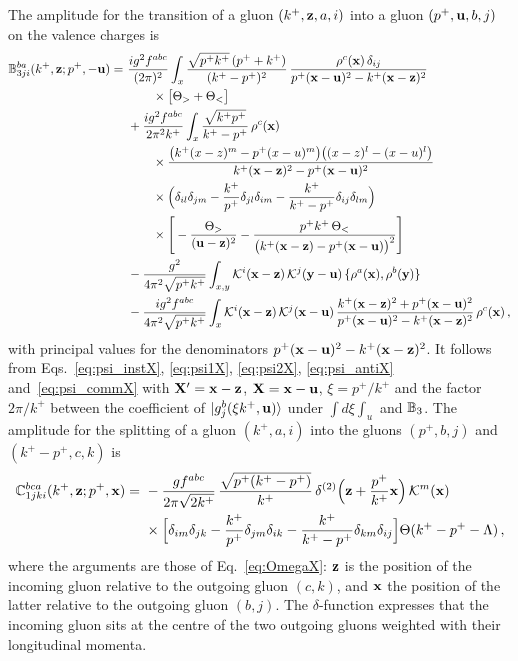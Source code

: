The amplitude for the transition of a gluon $(k^+,\mathbf{z},a,i)$ into a gluon $(p^+,\mathbf{u},b,j)$ on the valence charges is
\begin{align}\label{eq:B3X}
\mf B^{ba}_{3ji}(k^+,\v z;p^+,-\v u)=\ &\frac{ig^2f^{abc}}{(2\pi)^2}\int_x\frac{\sqrt{p^+k^+}\,(p^++k^+)}{(k^+-p^+)^2}\,\frac{\rho^c(\v x)\,\delta_{ij}}{p^+(\v x-\v u)^2-k^+(\v x-\v z)^2}
\notag\\&\qquad\times\big[\Theta_>+\Theta_<\big]
\notag\\&
+\frac{ig^2f^{abc}}{2\pi^2k^+}\int_x\frac{\sqrt{k^+p^+}}{k^+-p^+}\,\rho^c(\v x)
\notag\\&\qquad\times\frac{\big(k^+(x-z)^m-p^+(x-u)^m\big)\big((x-z)^l-(x-u)^l\big)}{k^+(\v x-\v z)^2-p^+(\v x-\v u)^2}
\notag\\&\qquad\times\Big(\delta_{il}\delta_{jm}-\frac{k^+}{p^+}\delta_{jl}\delta_{im}-\frac{k^+}{k^+-p^+}\delta_{ij}\delta_{lm}\Big)
\notag\\&\qquad\times\Bigg[-\frac{\Theta_>}{(\v u-\v z)^2}-\frac{p^+k^+\,\Theta_<}{\big(k^+(\v x-\v z)-p^+(\v x-\v u)\big)^2}\Bigg]
\notag\\&
-\frac{g^2}{4\pi^2\sqrt{p^+k^+}}\int_{x,y}\Kv^i(\v x-\v z)\,\Kv^j(\v y-\v u)\,\{\rho^a(\v x),\rho^b(\v y)\}
\notag\\&
-\frac{ig^2f^{abc}}{4\pi^2\sqrt{p^+k^+}}\int_x\Kv^i(\v x-\v z)\,\Kv^j(\v x-\v u)\,
\frac{k^+(\v x-\v z)^2+p^+(\v x-\v u)^2}{p^+(\v x-\v u)^2-k^+(\v x-\v z)^2}\,\rho^c(\v x)\,,
\end{align}
with principal values for the denominators $p^+(\mathbf{x}-\mathbf{u})^2-k^+(\mathbf{x}-\mathbf{z})^2$. It follows from Eqs.~\eqref{eq:psi_instX}, \eqref{eq:psi1X}, \eqref{eq:psi2X}, \eqref{eq:psi_antiX} and~\eqref{eq:psi_commX} with $\mathbf{X}'=\mathbf{x}-\mathbf{z}$, $\mathbf{X}=\mathbf{x}-\mathbf{u}$, $\xi=p^+/k^+$ and the factor $2\pi/k^+$ between the coefficient of $\ket{g^b_j(\xi k^+,\mathbf{u})}$ under $\int d\xi\int_u$ and $\mathbb{B}_3$. The amplitude for the splitting of a gluon $(k^+,a,i)$ into the gluons $(p^+,b,j)$ and $(k^+-p^+,c,k)$ is
\begin{align}\label{eq:C1X}
\mf C^{bca}_{1jki}(k^+,\v z;p^+,\v x)=\ &-\frac{gf^{abc}}{2\pi\sqrt{2k^+}}\,\frac{\sqrt{p^+(k^+-p^+)}}{k^+}\,\delta^{(2)}\Big(\v z+\frac{p^+}{k^+}\v x\Big)\,\Kv^m(\v x)
\notag\\&\times\Big[\delta_{im}\delta_{jk}-\frac{k^+}{p^+}\delta_{jm}\delta_{ik}-\frac{k^+}{k^+-p^+}\delta_{km}\delta_{ij}\Big]\Theta(k^+-p^+-\Lambda)\,,
\end{align}
where the arguments are those of Eq.~\eqref{eq:OmegaX}: $\mathbf{z}$ is the position of the incoming gluon relative to the outgoing gluon $(c,k)$, and $\mathbf{x}$ the position of the latter relative to the outgoing gluon $(b,j)$. The $\delta$-function expresses that the incoming gluon sits at the centre of the two outgoing gluons weighted with their longitudinal momenta.

